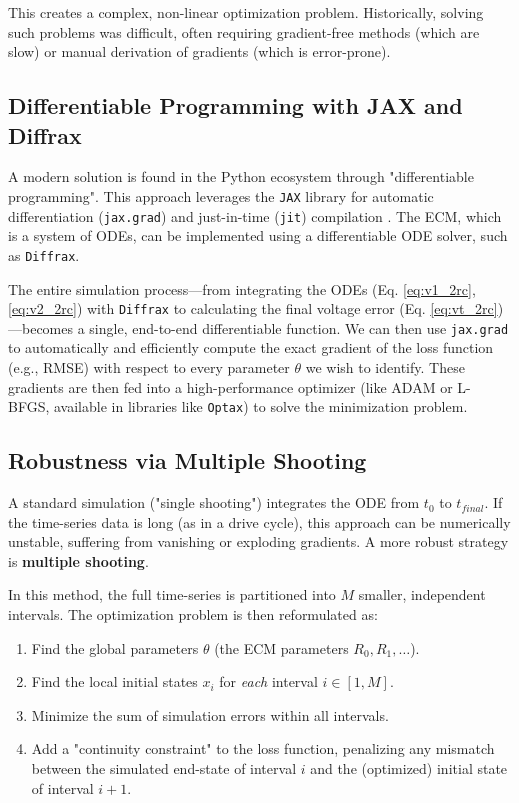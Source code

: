 \documentclass[]{article}
\begin{document}
This creates a complex, non-linear optimization problem. Historically, solving such problems was difficult, often requiring gradient-free methods (which are slow) or manual derivation of gradients (which is error-prone).

\subsection{Differentiable Programming with JAX and Diffrax}

A modern solution is found in the Python ecosystem through "differentiable programming". This approach leverages the \texttt{JAX} library for automatic differentiation (\texttt{jax.grad}) and just-in-time (\texttt{jit}) compilation \cite{kidger2021diffrax}. The ECM, which is a system of ODEs, can be implemented using a differentiable ODE solver, such as \texttt{Diffrax}.

The entire simulation process—from integrating the ODEs (Eq. \ref{eq:v1_2rc}, \ref{eq:v2_2rc}) with \texttt{Diffrax} to calculating the final voltage error (Eq. \ref{eq:vt_2rc})—becomes a single, end-to-end differentiable function. We can then use \texttt{jax.grad} to automatically and efficiently compute the exact gradient of the loss function (e.g., RMSE) with respect to every parameter $\theta$ we wish to identify. These gradients are then fed into a high-performance optimizer (like ADAM or L-BFGS, available in libraries like \texttt{Optax}) to solve the minimization problem.

\subsection{Robustness via Multiple Shooting}

A standard simulation ("single shooting") integrates the ODE from $t_0$ to $t_{final}$. If the time-series data is long (as in a drive cycle), this approach can be numerically unstable, suffering from vanishing or exploding gradients. A more robust strategy is \textbf{multiple shooting}.

In this method, the full time-series is partitioned into $M$ smaller, independent intervals. The optimization problem is then reformulated as:
\begin{enumerate}
	\item Find the global parameters $\theta$ (the ECM parameters $R_0, R_1, \dots$).
	\item Find the local initial states $x_i$ for \textit{each} interval $i \in [1, M]$.
	\item Minimize the sum of simulation errors within all intervals.
	\item Add a "continuity constraint" to the loss function, penalizing any mismatch between the simulated end-state of interval $i$ and the (optimized) initial state of interval $i+1$.
\end{enumerate}
\end{document}
